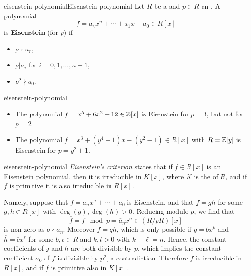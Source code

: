 \begin{topic}{eisenstein-polynomial}{Eisenstein polynomial}
    Let $R$ be a  and $p \in R$ an . A polynomial
    \[ f = a_n x^n + \cdots + a_1 x + a_0 \in R[x] \]
    is \textbf{Eisenstein} (for $p$) if
    \begin{itemize}
        \item $p \nmid a_n$,
        \item $p | a_i$ for $i = 0, 1, \ldots, n - 1$,
        \item $p^2 \nmid a_0$.
    \end{itemize}
\end{topic}

\begin{example}{eisenstein-polynomial}
    \begin{itemize}
        \item The polynomial $f = x^5 + 6x^2 - 12 \in \mathbb{Z}[x]$ is Eisenstein for $p = 3$, but not for $p = 2$.
        \item The polynomial $f = x^3 + (y^4 - 1) x - (y^2 - 1) \in R[x]$ with $R = \mathbb{Z}[y]$ is Eisenstein for $p = y^2 + 1$.
    \end{itemize}
\end{example}

\begin{example}{eisenstein-polynomial}
    \textit{Eisenstein's criterion} states that if $f \in R[x]$ is an Eisenstein polynomial, then it is irreducible in $K[x]$, where $K$ is the  of $R$, and if $f$ is primitive it is also irreducible in $R[x]$.
    
    Namely, suppose that $f = a_n x^n + \cdots + a_0$ is Eisenstein, and that $f = gh$ for some $g, h \in R[x]$ with $\deg(g), \deg(h) > 0$. Reducing modulo $p$, we find that
    \[ \overline{f} = f \mod p = \overline{a}_n x^n \in (R/pR)[x] \]
    is non-zero as $p \nmid a_n$. Moreover $\overline{f} = \overline{g} \overline{h}$, which is only possible if $\overline{g} = \overline{b} x^k$ and $\overline{h} = \overline{c} x^\ell$ for some $b, c \in R$ and $k, l > 0$ with $k + \ell = n$. Hence, the constant coefficients of $g$ and $h$ are both divisible by $p$, which implies the constant coefficient $a_0$ of $f$ is divisible by $p^2$, a contradiction. Therefore $f$ is irreducible in $R[x]$, and if $f$ is primitive also in $K[x]$.
\end{example}

